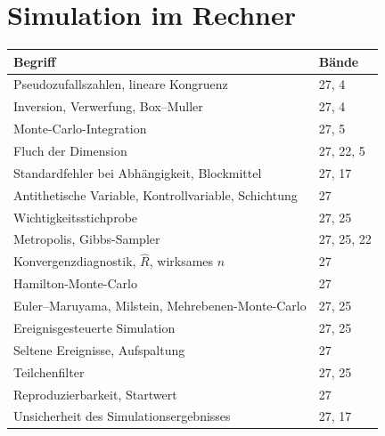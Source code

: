 \section*{Simulation im Rechner}
\nopagebreak
{\small\renewcommand{\arraystretch}{1.32}
\begin{longtable}{@{}P{5.6cm}P{2.8cm}@{}}
\toprule
\textbf{Begriff} & \textbf{Bände}\\
\midrule
\endhead
Pseudozufallszahlen, lineare Kongruenz & 27, 4\\
Inversion, Verwerfung, Box--Muller & 27, 4\\
Monte-Carlo-Integration & 27, 5\\
Fluch der Dimension & 27, 22, 5\\
Standardfehler bei Abhängigkeit, Blockmittel & 27, 17\\
Antithetische Variable, Kontrollvariable, Schichtung & 27\\
Wichtigkeitsstichprobe & 27, 25\\
Metropolis, Gibbs-Sampler & 27, 25, 22\\
Konvergenzdiagnostik, $\hat R$, wirksames $n$ & 27\\
Hamilton-Monte-Carlo & 27\\
Euler--Maruyama, Milstein, Mehrebenen-Monte-Carlo & 27, 25\\
Ereignisgesteuerte Simulation & 27, 25\\
Seltene Ereignisse, Aufspaltung & 27\\
Teilchenfilter & 27, 25\\
Reproduzierbarkeit, Startwert & 27\\
Unsicherheit des Simulationsergebnisses & 27, 17\\
\bottomrule
\end{longtable}}
